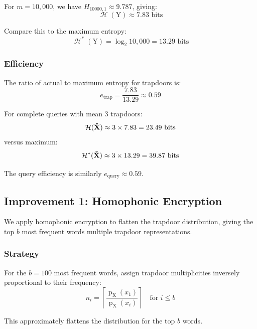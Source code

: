 \documentclass[final,11pt]{article}
\newcommand{\rvhqb}[1][]{%
   \ifthenelse{ \equal{#1}{} }
      {\ensuremath{\rv{\vec{\check{X}}}}}
      {\ensuremath{\rv{\vec{\check{X}_{#1}}}}}
}
\newcommand{\rv}[1]{\mathrm{#1}}
\newcommand{\entropy}{\operatorname{\mathcal{H}}}
\newcommand{\pmf}{\operatorname{p}}
\renewcommand{\vec}[1]{\boldsymbol{\mathbf{#1}}}
\numberwithin{equation}{section}
\theoremstyle{plain}
\theoremstyle{remark}
\begin{document}
For $m=10{,}000$, we have $H_{10000,1} \approx 9.787$, giving:
\begin{equation}
    \entropy(\rv{Y}) \approx 7.83 \text{ bits}
\end{equation}

Compare this to the maximum entropy:
\begin{equation}
    \entropy^*(\rv{Y}) = \log_2 10{,}000 = 13.29 \text{ bits}
\end{equation}

\subsubsection{Efficiency}
The ratio of actual to maximum entropy for trapdoors is:
\begin{equation}
    e_{\text{trap}} = \frac{7.83}{13.29} \approx 0.59
\end{equation}

For complete queries with mean 3 trapdoors:
\begin{equation}
    \entropy(\rvhqb) \approx 3 \times 7.83 = 23.49 \text{ bits}
\end{equation}
versus maximum:
\begin{equation}
    \entropy^*(\rvhqb) \approx 3 \times 13.29 = 39.87 \text{ bits}
\end{equation}

The query efficiency is similarly $e_{\text{query}} \approx 0.59$.

\subsection{Improvement 1: Homophonic Encryption}
\label{subsec:homophonic}
We apply homophonic encryption to flatten the trapdoor distribution, giving the top $b$ most frequent words multiple trapdoor representations.

\subsubsection{Strategy}
For the $b=100$ most frequent words, assign trapdoor multiplicities inversely proportional to their frequency:
\begin{equation}
    n_i = \left\lceil \frac{\pmf_{\rv{X}}(x_1)}{\pmf_{\rv{X}}(x_i)} \right\rceil \quad \text{for } i \leq b
\end{equation}

This approximately flattens the distribution for the top $b$ words.
\end{document}
